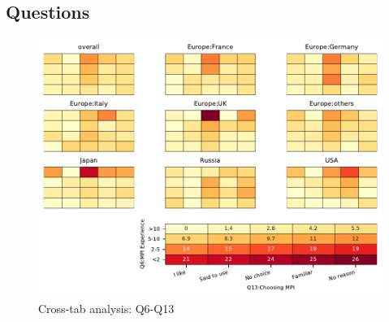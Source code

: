 
\subsection{Questions}


\begin{figure}
\begin{center}
\includegraphics[width=12cm]{../pdfs/Q6-Q13.pdf}
\caption{Cross-tab analysis: Q6-Q13}
\label{fig:Q6-Q13}
\end{center}
\end{figure}
